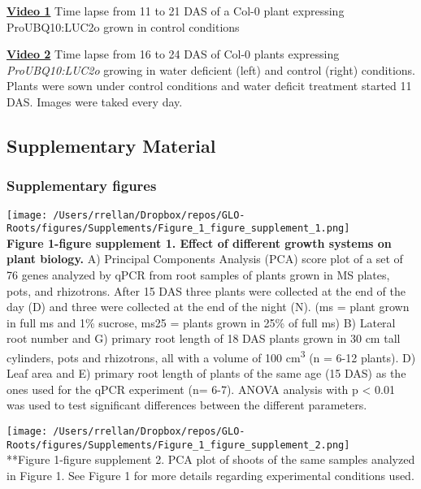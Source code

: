 \documentclass[]{article}
\begin{document}
\href{https://www.dropbox.com/s/sxjc04o0yj2faif/Video_1.avi?dl=0}{\textbf{Video
1}} Time lapse from 11 to 21 DAS of a Col-0 plant expressing
ProUBQ10:LUC2o grown in control conditions

\href{https://www.dropbox.com/s/x24x1uhvc8x0ou9/Video_3.avi?dl=0}{\textbf{Video
2}} Time lapse from 16 to 24 DAS of Col-0 plants expressing
\emph{ProUBQ10:LUC2o} growing in water deficient (left) and control
(right) conditions. Plants were sown under control conditions and water
deficit treatment started 11 DAS. Images were taked every day.

\pagebreak

\subsection{Supplementary Material}\label{supplementary-material}

\subsubsection{Supplementary figures}\label{supplementary-figures}

\texttt{[image: /Users/rrellan/Dropbox/repos/GLO-Roots/figures/Supplements/Figure\_1\_figure\_supplement\_1.png]}\\\textbf{Figure
1-figure supplement 1. Effect of different growth systems on plant
biology.} A) Principal Components Analysis (PCA) score plot of a set of
76 genes analyzed by qPCR from root samples of plants grown in MS
plates, pots, and rhizotrons. After 15 DAS three plants were collected
at the end of the day (D) and three were collected at the end of the
night (N). (ms = plant grown in full ms and 1\% sucrose, ms25 = plants
grown in 25\% of full ms) B) Lateral root number and G) primary root
length of 18 DAS plants grown in 30 cm tall cylinders, pots and
rhizotrons, all with a volume of 100 cm\textsuperscript{3} (n = 6-12
plants). D) Leaf area and E) primary root length of plants of the same
age (15 DAS) as the ones used for the qPCR experiment (n= 6-7). ANOVA
analysis with p \textless{} 0.01 was used to test significant
differences between the different parameters.

\pagebreak

\texttt{[image: /Users/rrellan/Dropbox/repos/GLO-Roots/figures/Supplements/Figure\_1\_figure\_supplement\_2.png]}\\**Figure
1-figure supplement 2. PCA plot of shoots of the same samples analyzed
in Figure 1. See Figure 1 for more details regarding experimental
conditions used.
\end{document}
